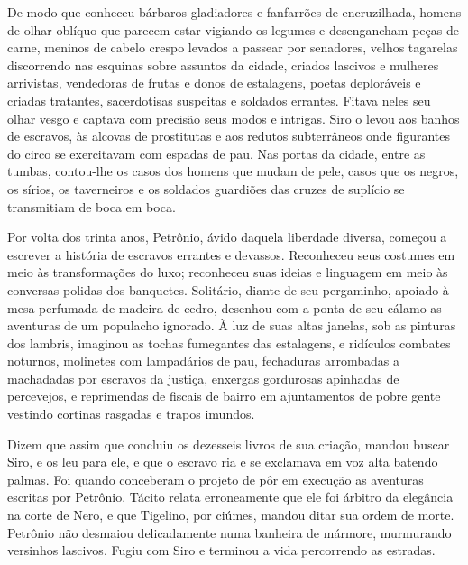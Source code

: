 De modo que conheceu bárbaros gladiadores e fanfarrões de encruzilhada,
homens de olhar oblíquo que parecem estar vigiando os legumes e
desengancham peças de carne, meninos de cabelo crespo levados a passear
por senadores, velhos tagarelas discorrendo nas esquinas sobre assuntos da
cidade, criados lascivos e mulheres arrivistas, vendedoras de frutas e
donos de estalagens, poetas deploráveis e criadas tratantes, sacerdotisas
suspeitas e soldados errantes. Fitava neles seu olhar vesgo e captava com
precisão seus modos e intrigas. Siro o levou aos banhos de escravos, às
alcovas de prostitutas e aos redutos subterrâneos onde figurantes do circo
se exercitavam com espadas de pau. Nas portas da cidade, entre as tumbas,
contou-lhe os casos dos homens que mudam de pele, casos que os negros, os
sírios, os taverneiros e os soldados guardiões das cruzes de suplício se
transmitiam de boca em boca.

Por volta dos trinta anos, Petrônio, ávido daquela liberdade diversa,
começou a escrever a história de escravos errantes e devassos. Reconheceu
seus costumes em meio às transformações do luxo; reconheceu suas ideias e
linguagem em meio às conversas polidas dos banquetes. Solitário, diante de
seu pergaminho, apoiado à mesa perfumada de madeira de cedro, desenhou com
a ponta de seu cálamo as aventuras de um populacho ignorado. À luz de suas
altas janelas, sob as pinturas dos lambris, imaginou as tochas fumegantes
das estalagens, e ridículos combates noturnos, molinetes com lampadários
de pau, fechaduras arrombadas a machadadas por escravos da justiça,
enxergas gordurosas apinhadas de percevejos, e reprimendas de fiscais de
bairro em ajuntamentos de pobre gente vestindo cortinas rasgadas e trapos
imundos.

Dizem que assim que concluiu os dezesseis livros de sua criação, mandou
buscar Siro, e os leu para ele, e que o escravo ria e se exclamava em voz
alta batendo palmas. Foi quando conceberam o projeto de pôr em execução as
aventuras escritas por Petrônio. Tácito relata erroneamente que ele foi
árbitro da elegância na corte de Nero, e que Tigelino, por ciúmes, mandou
ditar sua ordem de morte. Petrônio não desmaiou delicadamente numa
banheira de mármore, murmurando versinhos lascivos. Fugiu com Siro e
terminou a vida percorrendo as estradas.

